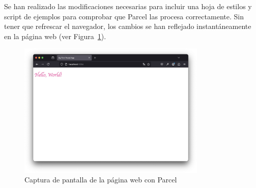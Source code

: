 \documentclass{article}
\begin{document}
Se han realizado las modificaciones necesarias para incluir una hoja de estilos y script de ejemplos para comprobar que Parcel las procesa correctamente.
Sin tener que refrescar el navegador, los cambios se han reflejado instantáneamente en la página web (ver Figura~\ref{fig:parcel}).

 \begin{figure}[h!]
     \centering
     \includegraphics[width=0.8\textwidth]{./img/hello-world-styled}
     \caption{Captura de pantalla de la página web con Parcel}
     \label{fig:parcel}
 \end{figure}
\end{document}
